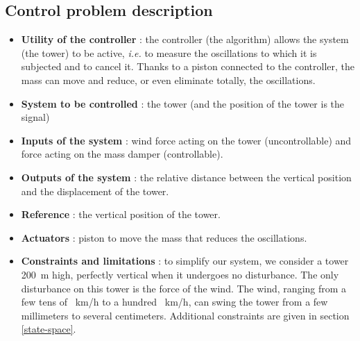 \subsection{Control problem description}
\begin{itemize}
    \item {\bf Utility of the controller} : the controller (the algorithm) allows the system (the tower) to be active, {\it i.e.} to measure the oscillations to which it is subjected and to cancel it. Thanks to a piston connected to the controller, the mass can move and reduce, or even eliminate totally, the oscillations.
    \item {\bf System to be controlled} : the tower (and the position of the tower is the signal)
    \item {\bf Inputs of the system} : wind force acting on the tower (uncontrollable) and force acting on the mass damper (controllable).
    \item {\bf Outputs of the system} : the relative distance between the vertical position and the displacement of the tower.
    \item {\bf Reference} : the vertical position of the tower.
    \item {\bf Actuators} : piston to move the mass that reduces the oscillations.
    \item {\bf Constraints and limitations} : to simplify our system, we consider a tower \SI{200}{\meter} high, perfectly vertical when it undergoes no disturbance. The only disturbance on this tower is the force of the wind. The wind, ranging from a few tens of \SI{}{\kilo\meter/\hour} to a hundred \SI{}{\kilo\meter/\hour}, can swing the tower from a few millimeters to several centimeters. Additional constraints are given in section \ref{state-space}.
\end{itemize}

